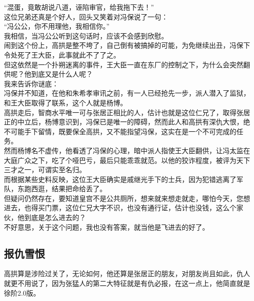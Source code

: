 \begin{multicols}{\theparacolNo}
“混蛋，竟敢胡说八道，诬陷审官，给我拖下去！”\\

这位兄弟还真是个好人，回头又笑着对冯保说了一句：\\

“冯公公，你不用理他，我相信你。”\\

我相信，当冯公公听到这句话时，应该不会感到欣慰。\\

闹到这个份上，高拱是整不垮了，自己倒有被搞掉的可能，为免继续出丑，冯保下令处死了王大臣，此事就此不了了之。\\

但这依然是一个扑朔迷离的事件，王大臣一直在东厂的控制之下，为什么会突然翻供呢？他到底又是什么人呢？\\

我来告诉你谜底：\\

冯保并不知道，在他和朱希孝审讯之前，有一人已经抢先一步，派人潜入了监狱，和王大臣取得了联系，这个人就是杨博。\\

高拱走后，智商水平唯一可与张居正相比的人，估计也就是这位仁兄了，取得张居正的中立后，杨博意识到，冯保已是唯一的障碍，然而此人和高拱有深仇大恨，绝不可能手下留情，既要保全高拱，又不能指望冯保，这实在是一个不可完成的任务。\\

然而杨博名不虚传，他看透了冯保的心理，暗中派人指使王大臣翻供，让冯太监在大庭广众之下，吃了个哑巴亏，最后只能乖乖就范。以他的狡诈程度，被评为天下三才之一，可谓实至名归。\\

而根据某些史料反映，这位王大臣确实是戚继光手下的士兵，因为犯错逃离了军队，东跑西逛，结果把命给丢了。\\

但疑问仍然存在，要知道皇宫不是公共厕所，想来就来想走就走，哪怕今天，您想进去，也得买门票，这位仁兄大字不识，也没有通行证，估计也没钱，这么个家伙，他到底是怎么进去的？\\

不好意思，关于这个问题，我也没有答案，就当他是飞进去的好了。\\

\subsection{报仇雪恨}
高拱算是涉险过关了，无论如何，他还算是张居正的朋友，对朋友尚且如此，仇人就更不用说了，因为张猛人的第二大特征就是有仇必报，在这一点上，他简直就是徐阶2.0版。\\


\end{multicols}
